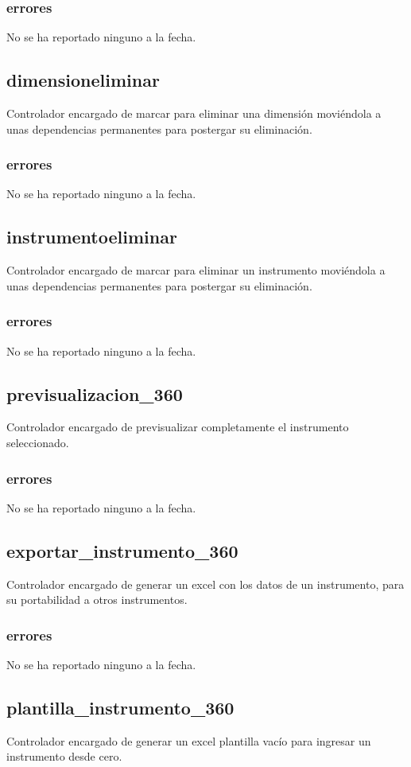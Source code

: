 \documentclass[10pt,a4paper]{book}
\begin{document}
	\subsubsection{errores}
	No se ha reportado ninguno a la fecha.

	\subsection{dimensioneliminar}
	Controlador encargado de marcar para eliminar una dimensión moviéndola a unas dependencias permanentes para postergar su eliminación.
	\subsubsection{errores}
	No se ha reportado ninguno a la fecha.

	\subsection{instrumentoeliminar}
	Controlador encargado de marcar para eliminar un instrumento moviéndola a unas dependencias permanentes para postergar su eliminación.
	\subsubsection{errores}
	No se ha reportado ninguno a la fecha.

	\subsection{previsualizacion\_360}
	Controlador encargado de previsualizar completamente el instrumento seleccionado.
	\subsubsection{errores}
	No se ha reportado ninguno a la fecha.

	\subsection{exportar\_instrumento\_360}
	Controlador encargado de generar un excel con los datos de un instrumento, para su portabilidad a otros instrumentos.
	\subsubsection{errores}
	No se ha reportado ninguno a la fecha.

	\subsection{plantilla\_instrumento\_360}
	Controlador encargado de generar un excel plantilla vacío para ingresar un instrumento desde cero.
\end{document}
